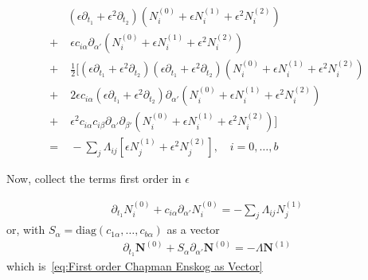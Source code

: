\documentclass[]{article}
\begin{document}
\begin{appendices}
\begin{equation*}
 \begin{aligned}
	 & (\epsilon\partial_{t_1} + \epsilon^2\partial_{t_2}) (N_i^{(0)} + \epsilon N_i^{(1)}+ \epsilon^2 N_i^{(2)}) \\
	 + &\; \epsilon c_{i\alpha}\partial_{\alpha'} (N_i^{(0)} + \epsilon N_i^{(1)}+ \epsilon^2 N_i^{(2)}) \\
	 + &\; \frac{1}{2} [(\epsilon\partial_{t_1} + \epsilon^2\partial_{t_2})(\epsilon\partial_{t_1} + \epsilon^2\partial_{t_2}) (N_i^{(0)} + \epsilon N_i^{(1)}+ \epsilon^2 N_i^{(2)}) \\
	 + &\; 2 \epsilon c_{i\alpha}(\epsilon\partial_{t_1} + \epsilon^2\partial_{t_2}) \partial_{\alpha'} (N_i^{(0)} + \epsilon N_i^{(1)}+ \epsilon^2 N_i^{(2)}) \\
	 + &\; \epsilon^2 c_{i\alpha}c_{i\beta}\partial_{\alpha'}\partial_{\beta'} (N_i^{(0)} + \epsilon N_i^{(1)}+ \epsilon^2 N_i^{(2)})]\\
	 = &\; - \sum_j \Lambda_{ij} [ \epsilon N_j^{(1)}+ \epsilon^2 N_j^{(2)} ], \quad i = 0, \dots, b
 \end{aligned}
\end{equation*}

Now, collect the terms first order in $\epsilon$

\begin{equation*}
	\begin{aligned}
		\partial_{t_1} N_i^{(0)} + c_{i\alpha}\partial_{\alpha'} N_i^{(0)} = - \sum_j \Lambda_{ij}  N_j^{(1)}
	\end{aligned}
\end{equation*}
or, with $S_\alpha = \text{diag}(c_{1\alpha}, \dots, c_{b\alpha})$ as a vector
\begin{equation*}
	\begin{aligned}
		\partial_{t_1} \boldsymbol{N}^{(0)} + S_{\alpha}\partial_{\alpha'} \boldsymbol{N}^{(0)} = -  \Lambda \boldsymbol{N}^{(1)}
	\end{aligned}
\end{equation*}
which is~\eqref{eq:First order Chapman Enskog as Vector}


\end{appendices}
\end{document}
